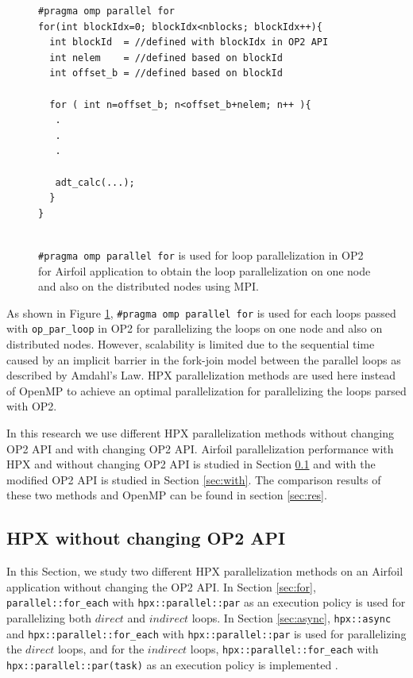 \documentclass[conference]{IEEEtran}
\begin{document}
\begin{figure} [!h]
    \begin{lstlisting}
#pragma omp parallel for
for(int blockIdx=0; blockIdx<nblocks; blockIdx++){
  int blockId  = //defined with blockIdx in OP2 API
  int nelem    = //defined based on blockId 
  int offset_b = //defined based on blockId
        
  for ( int n=offset_b; n<offset_b+nelem; n++ ){
   .
   .
   .

   adt_calc(...);
  }
}
  
    \end{lstlisting}
    \caption{\small{\texttt{\#pragma omp parallel for} is used for loop parallelization in OP2 for Airfoil application to obtain the loop parallelization on one node and also on the distributed nodes using MPI.}}
    \label{l2}
\end{figure}


As shown in Figure \ref{l2}, \texttt{\#pragma omp parallel for} is used for each loops passed with \texttt{op\_par\_loop} in OP2 for parallelizing the loops on one node and also on distributed nodes. However, scalability is limited due to the sequential time caused by an implicit barrier in the fork-join model \cite{r23} between the parallel loops as described by Amdahl's Law. HPX parallelization methods are used here instead of OpenMP to achieve an optimal parallelization for parallelizing the loops parsed with OP2. 

In this research we use different HPX parallelization methods without changing OP2 API and with changing OP2 API. Airfoil parallelization performance with HPX and without changing OP2 API is studied in Section \ref{sec:without} and with the modified OP2 API is studied in Section \ref{sec:with}. The comparison results of these two methods and OpenMP can be found in section \ref{sec:res}.

\subsection{\textbf{HPX without changing OP2 API}}
\label{sec:without}

In this Section, we study two different HPX parallelization methods on an Airfoil application without changing the OP2 API. In Section \ref{sec:for}, \texttt{parallel::for\_each} with \texttt{hpx::parallel::par} as an execution policy is used for parallelizing both $direct$ and $indirect$ loops. In Section \ref{sec:async}, \texttt{hpx::async} and \texttt{hpx::parallel::for\_each} with \texttt{hpx::parallel::par} is used for parallelizing the $direct$ loops, and for the $indirect$ loops, \texttt{hpx::parallel::for\_each} with \texttt{hpx::parallel::par(task)} as an execution policy is implemented . 
\end{document}
